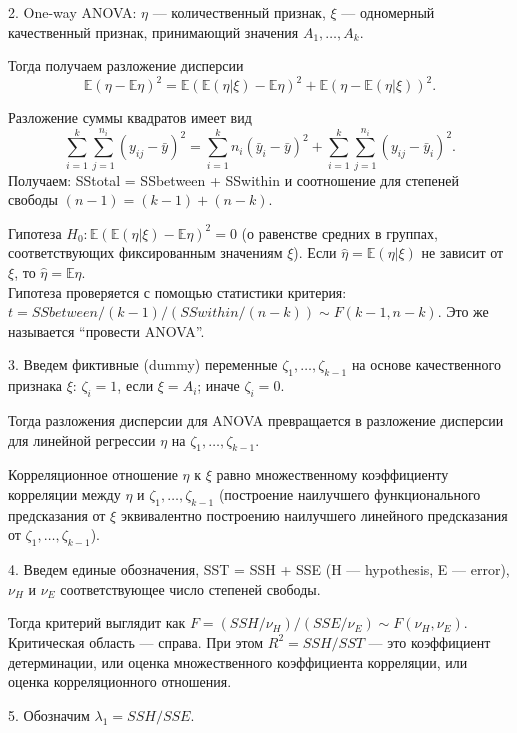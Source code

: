 \documentclass[12 pt]{article}
\def\E{\mathbb{E}}
\begin{document}
2. One-way ANOVA: $\eta$ --- количественный признак, $\xi$ --- одномерный качественный признак, принимающий значения
$A_1,\ldots,A_k$.

Тогда получаем разложение дисперсии
\begin{equation}
\label{eq:pif_eta_anova}
\E(\eta - \E\eta)^2 = \E(\E(\eta|\xi) - \E\eta)^2+ \E(\eta - \E(\eta|\xi))^2.
\end{equation}

Разложение суммы квадратов имеет вид
\begin{equation}
\label{eq:pif_y_anova}\sum_{i=1}^k\sum_{j=1}^{n_i}(y_{ij}-\bar{y})^2 = \sum_{i=1}^k n_i(\bar{y}_i-\bar{y})^2 + \sum_{i=1}^k\sum_{j=1}^{n_i}(y_{ij}-\bar{y}_i)^2.
\end{equation}
Получаем: \mbox{SStotal}  = \mbox{SSbetween} + \mbox{SSwithin}
и соотношение для степеней свободы $(n-1) = (k-1) + (n-k)$.

Гипотеза $H_0: \E(\E(\eta|\xi) - \E\eta)^2 = 0$ (о равенстве средних в группах, соответствующих фиксированным значениям $\xi$). Если $\hat\eta = \E(\eta|\xi)$ не зависит от $\xi$, то $\hat\eta = \E\eta$.\\
Гипотеза проверяется с помощью статистики критерия: $t = SSbetween/(k-1) / (SSwithin/(n-k))\sim F(k-1, n-k)$. Это же называется ``провести ANOVA''.

3. Введем фиктивные (dummy) переменные $\zeta_1,\ldots,\zeta_{k-1}$ на основе качественного признака $\xi$:
$\zeta_i = 1$, если $\xi=A_i$; иначе $\zeta_i = 0$.

Тогда разложения дисперсии для ANOVA превращается в разложение дисперсии для линейной регрессии $\eta$  на  $\zeta_1,\ldots,\zeta_{k-1}$.

Корреляционное отношение $\eta$ к $\xi$ равно множественному коэффициенту корреляции между $\eta$ и $\zeta_1,\ldots,\zeta_{k-1}$
(построение наилучшего функционального предсказания от $\xi$ эквивалентно построению наилучшего линейного предсказания
от $\zeta_1,\ldots,\zeta_{k-1}$).

4. Введем единые обозначения, SST = SSH + SSE  (H --- hypothesis, E --- error), $\nu_H$ и $\nu_E$ соответствующее число
степеней свободы.

Тогда критерий выглядит как $F = (SSH/\nu_H) / (SSE/\nu_E)\sim F(\nu_H,\nu_E)$. Критическая область --- справа.
При этом $R^2 = SSH/SST$ --- это коэффициент детерминации, или оценка множественного
коэффициента корреляции, или оценка корреляционного отношения.

5. Обозначим $\lambda_1 = SSH/SSE$.
\end{document}

